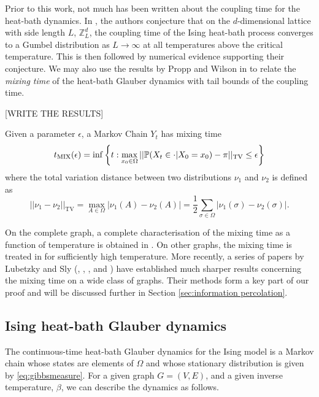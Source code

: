 	Prior to this work, not much has been written about the coupling time for the heat-bath dynamics. In \cite[Conjecture 7.1]{Collevecchio2018-nq}, the authors conjecture that on the $d$-dimensional lattice with side length $L$, $\mathbb{Z}^d_L$, the coupling time of the Ising heat-bath process converges to a Gumbel distribution as $L \rightarrow \infty$ at all temperatures above the critical temperature. This is then followed by numerical evidence supporting their conjecture. We may also use the results by Propp and Wilson in \cite[Section 5]{Propp1996-cf} to relate the \emph{mixing time} of the heat-bath Glauber dynamics with tail bounds of the coupling time.

	[WRITE THE RESULTS]

	Given a parameter $\epsilon$, a Markov Chain $Y_t$ has mixing time
	\begin{equation}
	\label{eq:mixing time definition}
		t_\mathrm{MIX}(\epsilon) = \inf\left\{t: \max_{x_0 \in \Omega} ||\mathbb{P}(X_t \in \cdot | X_0 = x_0) - \pi ||_\mathrm{TV} \leq \epsilon \right\}
	\end{equation}
	where the total variation distance between two distributions $\nu_1$ and $\nu_2$ is defined as 
	\begin{equation}
		||\nu_1 - \nu_2||_\mathrm{TV} = \max_{A \in \Omega}|\nu_1(A) - \nu_2(A)| = \frac{1}{2}\sum_{\sigma \in \Omega} |\nu_1(\sigma) - \nu_2(\sigma)|.
	\end{equation}

	
	On the complete graph, a complete characterisation of the mixing time as a function of temperature is obtained in \cite{Ding2009-du}. On other graphs, the mixing time is treated in \cite{Martinelli1994-bv} for sufficiently high temperature. More recently, a series of papers by Lubetzky and Sly (\cite{Lubetzky2013-yv}, \cite{Lubetzky2015-po}, \cite{Lubetzky2016-wd}, and \cite{Lubetzky2017-nc}) have established much sharper results concerning the mixing time on a wide class of graphs. Their methods form a key part of our proof and will be discussed further in Section \ref{sec:information percolation}.

	\subsection{Ising heat-bath Glauber dynamics}
	\label{sec:heat-bath glauber dynamics definition}
	The continuous-time heat-bath Glauber dynamics for the Ising model is a Markov chain whose states are elements of $\Omega$ and whose stationary distribution is given by \eqref{eq:gibbsmeasure}. For a given graph $G = (V, E)$, and a given inverse temperature, $\beta$, we can describe the dynamics as follows. 

